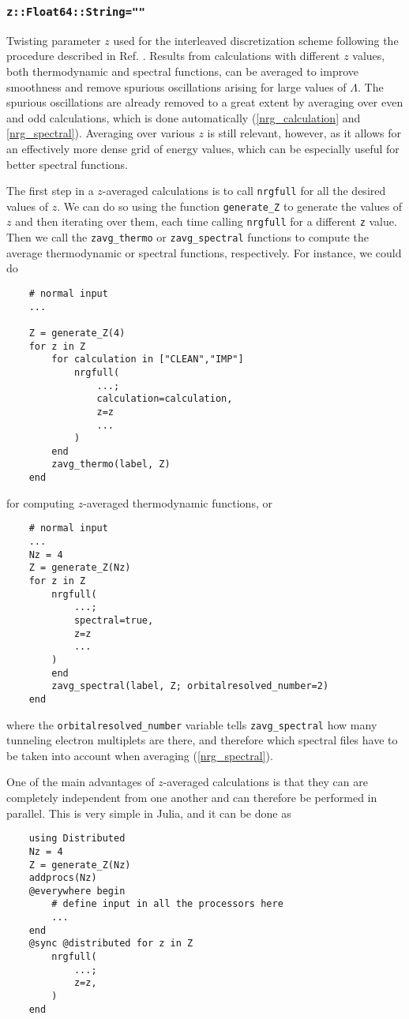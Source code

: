 \documentclass[notitlepage]{article}
\begin{document}
\subsubsection{\texttt{z::Float64::String=""}}
\label{nrg_z}
Twisting parameter $z$ used for the interleaved discretization
scheme following the procedure described in Ref.
\cite{campo2005}. Results from calculations with different
$z$ values, both thermodynamic and spectral functions, can
be averaged to improve smoothness and remove spurious
oscillations arising for large values of $\Lambda$. The
spurious oscillations are already removed to a great extent
by averaging over even and odd calculations, which is done
automatically (\ref{nrg_calculation} and
\ref{nrg_spectral}). Averaging over various $z$ is still
relevant, however, as it allows for an effectively more
dense grid of energy values, which can be especially useful
for better spectral functions.
\par
The first step in a $z$-averaged calculations is to call
\texttt{nrgfull} for all the desired values of $z$. We can
do so using the function \texttt{generate\_Z} to generate
the values of $z$ and then iterating over them, each time
calling \texttt{nrgfull} for a different \texttt{z} value. 
Then we call the \texttt{zavg\_thermo} or
\texttt{zavg\_spectral} functions to compute the average
thermodynamic or spectral functions, respectively. For
instance, we could do
\begin{verbatim}
    # normal input
    ...

    Z = generate_Z(4)
    for z in Z
        for calculation in ["CLEAN","IMP"]
            nrgfull(
                ...;
                calculation=calculation,
                z=z
                ...
            )
        end
        zavg_thermo(label, Z)
    end
\end{verbatim}
for computing $z$-averaged thermodynamic functions, or
\begin{verbatim}
    # normal input
    ...
    Nz = 4
    Z = generate_Z(Nz)
    for z in Z
        nrgfull(
            ...;
            spectral=true,
            z=z
            ...
        )
        end
        zavg_spectral(label, Z; orbitalresolved_number=2)
    end
\end{verbatim}
where the \texttt{orbitalresolved\_number} variable tells
\texttt{zavg\_spectral} how many tunneling electron
multiplets are there, and therefore which spectral files
have to be taken into account when averaging
(\ref{nrg_spectral}). 
\par
One of the main advantages of $z$-averaged calculations is
that they can are completely independent from one another
and can therefore be performed in parallel. This is very
simple in Julia, and it can be done as
\begin{verbatim}
    using Distributed
    Nz = 4
    Z = generate_Z(Nz)
    addprocs(Nz)
    @everywhere begin
        # define input in all the processors here
        ...
    end
    @sync @distributed for z in Z
        nrgfull(
            ...;
            z=z,
        )
    end
\end{verbatim}
\end{document}
